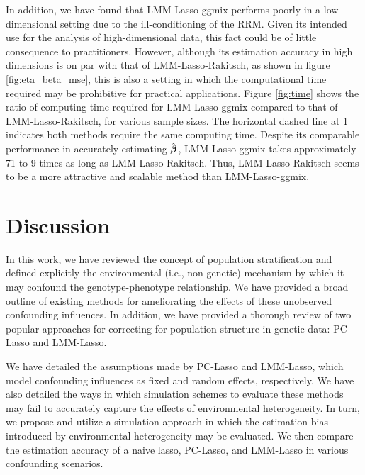 In addition, we have found that LMM-Lasso-ggmix performs poorly in a low-dimensional setting due to the ill-conditioning of the RRM. Given its intended use for the analysis of high-dimensional data, this fact could be of little consequence to practitioners. However, although its estimation accuracy in high dimensions is on par with that of LMM-Lasso-Rakitsch, as shown in figure \ref{fig:eta_beta_mse}, this is also a setting in which the computational time required may be prohibitive for practical applications. Figure \ref{fig:time} shows the ratio of computing time required for LMM-Lasso-ggmix compared to that of LMM-Lasso-Rakitsch, for various sample sizes. The horizontal dashed line at 1 indicates both methods require the same computing time. Despite its comparable performance in accurately estimating $\hat{\boldsymbol{\beta}}$, LMM-Lasso-ggmix takes approximately 71 to 9 times as long as LMM-Lasso-Rakitsch. Thus, LMM-Lasso-Rakitsch seems to be a more attractive and scalable method than LMM-Lasso-ggmix.


\section{Discussion} \label{sec:discussion}
In this work, we have reviewed the concept of population stratification and defined explicitly the environmental (i.e., non-genetic) mechanism by which it may confound the genotype-phenotype relationship. We have provided a broad outline of existing methods for ameliorating the effects of these unobserved confounding influences. In addition, we have provided a thorough review of two popular approaches for correcting for population structure in genetic data: PC-Lasso and LMM-Lasso. 

We have detailed the assumptions made by PC-Lasso and LMM-Lasso, which model confounding influences as fixed and random effects, respectively. We have also detailed the ways in which simulation schemes to evaluate these methods may fail to accurately capture the effects of environmental heterogeneity. In turn, we propose and utilize a simulation approach in which the estimation bias introduced by environmental heterogeneity may be evaluated. We then compare the estimation accuracy of a naive lasso, PC-Lasso, and LMM-Lasso in various confounding scenarios.

